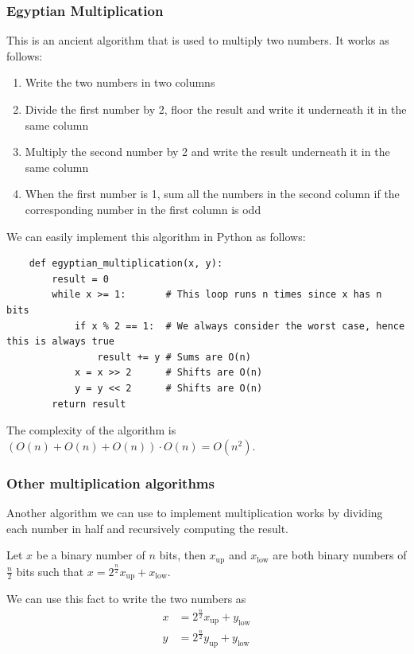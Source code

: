 \documentclass[12pt]{extarticle}
\begin{document}
\subsubsection{Egyptian Multiplication}

This is an ancient algorithm that is used to multiply two numbers.
It works as follows:

\begin{enumerate}
    \item Write the two numbers in two columns
    \item Divide the first number by 2, floor the result and write it underneath it in the same column
    \item Multiply the second number by 2 and write the result underneath it in the same column
    \item When the first number is 1, sum all the numbers in the second column if the corresponding number in the first column is odd
\end{enumerate}

We can easily implement this algorithm in Python as follows:
\begin{verbatim}
    def egyptian_multiplication(x, y):
        result = 0
        while x >= 1:       # This loop runs n times since x has n bits
            if x % 2 == 1:  # We always consider the worst case, hence this is always true
                result += y # Sums are O(n)
            x = x >> 2      # Shifts are O(n)
            y = y << 2      # Shifts are O(n)
        return result
\end{verbatim}

The complexity of the algorithm is $(O(n) + O(n) + O(n)) \cdot O(n) = O(n^2)$.

\subsubsection{Other multiplication algorithms}

Another algorithm we can use to implement multiplication works by dividing each number in half and recursively computing the result.

Let $x$ be a binary number of $n$ bits, then $x_{\text{up}}$ and $x_{\text{low}}$ are both binary numbers of $\frac{n}{2}$ bits such that $x = 2^{\frac{n}{2}}x_{\text{up}} + x_{\text{low}}$.

We can use this fact to write the two numbers as
\begin{align*}
    x & = 2^{\frac{n}{2}}x_{\text{up}} + y_{\text{low}} \\
    y & = 2^{\frac{n}{2}}y_{\text{up}} + y_{\text{low}}
\end{align*}
\end{document}
